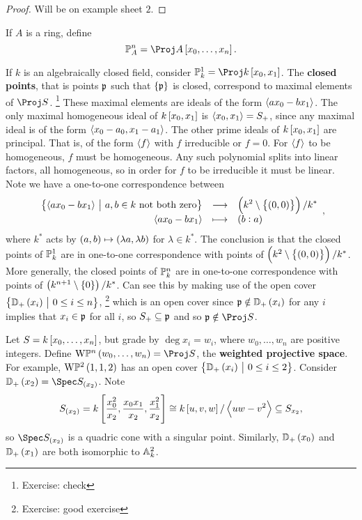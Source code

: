 \begin{proof}
Will be on example sheet $ 2 $.
\end{proof}

\begin{definition*}
If $ A $ is a ring, define
$$ \PP_A^n = \Proj A\sbr{x_0, \dots, x_n}. $$
\end{definition*}

\begin{example*}
If $ k $ is an algebraically closed field, consider $ \PP_k^1 = \Proj k\sbr{x_0, x_1} $. The \textbf{closed points}, that is points $ \ppp $ such that $ \cbr{\ppp} $ is closed, correspond to maximal elements of $ \Proj S $. \footnote{Exercise: check} These maximal elements are ideals of the form $ \abr{ax_0 - bx_1} $. The only maximal homogeneous ideal of $ k\sbr{x_0, x_1} $ is $ \abr{x_0, x_1} = S_+ $, since any maximal ideal is of the form $ \abr{x_0 - a_0, x_1 - a_1} $. The other prime ideals of $ k\sbr{x_0, x_1} $ are principal. That is, of the form $ \abr{f} $ with $ f $ irreducible or $ f = 0 $. For $ \abr{f} $ to be homogeneous, $ f $ must be homogeneous. Any such polynomial splits into linear factors, all homogeneous, so in order for $ f $ to be irreducible it must be linear. Note we have a one-to-one correspondence between
$$ \function{\cbr{\abr{ax_0 - bx_1} \st a, b \in k \ \text{not both zero}}}{\br{k^2 \setminus \cbr{\br{0, 0}}} / k^*}{\abr{ax_0 - bx_1}}{\br{b : a}}, $$
where $ k^* $ acts by $ \br{a, b} \mapsto \br{\lambda a, \lambda b} $ for $ \lambda \in k^* $. The conclusion is that the closed points of $ \PP_k^1 $ are in one-to-one correspondence with points of $ \br{k^2 \setminus \cbr{\br{0, 0}}} / k^* $. More generally, the closed points of $ \PP_k^n $ are in one-to-one correspondence with points of $ \br{k^{n + 1} \setminus \cbr{0}} / k^* $. Can see this by making use of the open cover $ \cbr{\DD_+\br{x_i} \st 0 \le i \le n} $, \footnote{Exercise: good exercise} which is an open cover since $ \ppp \notin \DD_+\br{x_i} $ for any $ i $ implies that $ x_i \in \ppp $ for all $ i $, so $ S_+ \subseteq \ppp $ and so $ \ppp \notin \Proj S $.
\end{example*}

\begin{example*}
Let $ S = k\sbr{x_0, \dots, x_n} $, but grade by $ \deg x_i = w_i $, where $ w_0, \dots, w_n $ are positive integers. Define $ \W\PP^n\br{w_0, \dots, w_n} = \Proj S $, the \textbf{weighted projective space}. For example, $ \W\PP^2\br{1, 1, 2} $ has an open cover $ \cbr{\DD_+\br{x_i} \st 0 \le i \le 2} $. Consider $ \DD_+\br{x_2} = \Spec S_{\br{x_2}} $. Note
$$ S_{\br{x_2}} = k\sbr{\dfrac{x_0^2}{x_2}, \dfrac{x_0x_1}{x_2}, \dfrac{x_1^2}{x_2}} \cong k\sbr{u, v, w} / \abr{uw - v^2} \subseteq S_{x_2}, $$
so $ \Spec S_{\br{x_2}} $ is a quadric cone with a singular point. Similarly, $ \DD_+\br{x_0} $ and $ \DD_+\br{x_1} $ are both isomorphic to $ \AA_k^2 $.
\end{example*}

